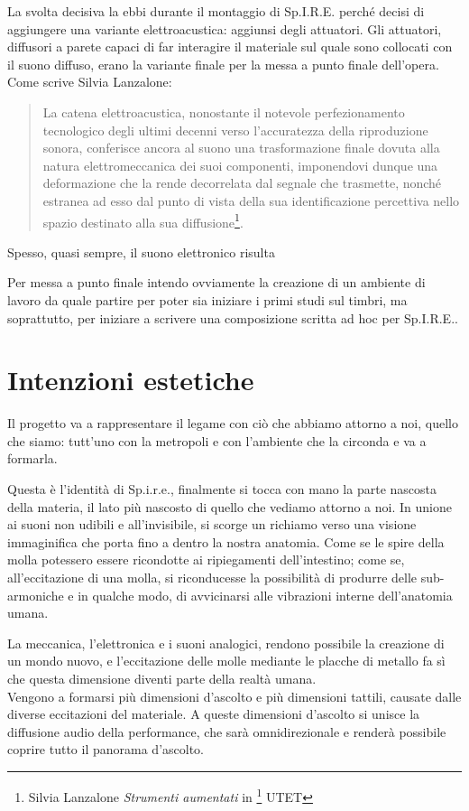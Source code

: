 La svolta decisiva la ebbi durante il montaggio di Sp.I.R.E. perché decisi di aggiungere una variante elettroacustica: aggiunsi degli attuatori. Gli attuatori, diffusori a parete capaci di far interagire il materiale sul quale sono collocati con il suono diffuso, erano la variante finale per la messa a punto finale dell'opera.
Come scrive Silvia Lanzalone:
\begin{quotation}
La catena elettroacustica, nonostante il notevole perfezionamento tecnologico degli ultimi decenni verso l'accuratezza della riproduzione sonora, conferisce ancora al suono una trasformazione finale dovuta alla natura elettromeccanica dei suoi componenti, imponendovi dunque una deformazione che la rende decorrelata dal segnale che trasmette, nonché estranea ad esso dal punto di vista della sua identificazione percettiva nello spazio destinato alla sua diffusione\footnote{Silvia Lanzalone \textit{Strumenti aumentati} in \footnote{Acustica} UTET}.
\end{quotation} 

Spesso, quasi sempre, il suono elettronico risulta 

Per messa a punto finale intendo ovviamente la creazione di un ambiente di lavoro da quale partire per poter sia iniziare i primi studi sul timbri, ma soprattutto, per iniziare a scrivere una composizione scritta ad hoc per Sp.I.R.E.. \\

\section{Intenzioni estetiche}
Il progetto va a rappresentare il legame con ciò che abbiamo attorno a noi, quello che siamo: tutt'uno con la metropoli e con l'ambiente che la circonda e va a formarla.

Questa è l'identità di Sp.i.r.e., finalmente si tocca con mano la parte nascosta della materia, il lato più nascosto di quello che vediamo attorno a noi. In unione ai suoni non udibili e all'invisibile, si scorge un richiamo verso una visione immaginifica che porta fino a dentro la nostra anatomia. Come se le spire della molla potessero essere ricondotte ai ripiegamenti dell'intestino; come se, all'eccitazione di una molla, si riconducesse la possibilità di produrre delle sub-armoniche e in qualche modo, di avvicinarsi alle vibrazioni interne dell'anatomia umana.

La meccanica, l'elettronica e i suoni analogici, rendono possibile la creazione di un mondo nuovo, e l'eccitazione delle molle mediante le placche di metallo fa sì che questa dimensione diventi parte della realtà umana. \\
Vengono a formarsi più dimensioni d'ascolto e più dimensioni tattili, causate dalle diverse eccitazioni del materiale. A queste dimensioni d'ascolto si unisce la diffusione audio della performance, che sarà omnidirezionale e renderà possibile coprire tutto il panorama d'ascolto.

